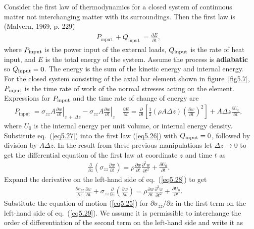 \documentclass{AeroStructure-ERJohnson}
\begin{document}
Consider the first law of thermodynamics for a closed system of continuous matter not interchanging matter with its surroundings. Then the first law is (Malvern, 1969, p. 229)
\begin{align}\label{eq5.26}
P_{\text {input }}+Q_{\text {input }}=\frac{\partial E}{\partial t},
\end{align}
where $P_{\rm input}$ is the power input of the external loads, $Q_{\rm input}$ is the rate of heat input, and $E$ is the total energy of the system. Assume the process is \textbf{adiabatic} so $Q_{\rm input} = 0$. The energy is the sum of the kinetic energy and internal energy. For the closed system consisting of the axial bar element shown in figure~\ref{fig5.7}, $P_{\rm input}$ is the time rate of work of the normal stresses acting on the element. Expressions for $P_{\rm input}$ and the time rate of change of energy are
\begin{align}\label{eq5.27}
P_{\text {input }}=\left.\sigma_{z z} A \frac{\partial w}{\partial t}\right|_{z\,+\,\Delta z}-\left.\sigma_{z z} A \frac{\partial w}{\partial t}\right|_{z} \quad \frac{\partial E}{\partial t}=\frac{\partial}{\partial t}\left[\frac{1}{2}(\rho A \Delta z)\left(\frac{\partial w}{\partial t}\right)^{2}\right]+A \Delta z \frac{\partial U_{0}}{\partial t},
\end{align}
where $U_0$ is the internal energy per unit volume, or internal energy density. Substitute eq.~(\ref{eq5.27}) into the first law (\ref{eq5.26}) with $Q_{\rm input} = 0$, followed by division by $A\Delta z$. In the result from these previous manipulations let $\Delta z \rightarrow 0$ to get the differential equation of the first law at coordinate $z$ and time $t$ as\pagebreak
\begin{align}\label{eq5.28}
\frac{\partial}{\partial z}\left(\sigma_{z z} \frac{\partial w}{\partial t}\right)=\rho \frac{\partial w}{\partial t} \frac{\partial^{2} w}{\partial t^{2}}+\frac{\partial U_{0}}{\partial t}.
\end{align}
Expand the derivative on the left-hand side of eq.~(\ref{eq5.28}) to get
\begin{align}\label{eq5.29}
\frac{\partial \sigma_{z z}}{\partial z} \frac{\partial w}{\partial t}+\sigma_{z z} \frac{\partial}{\partial z}\left(\frac{\partial w}{\partial t}\right)=\rho \frac{\partial w}{\partial t} \frac{\partial^{2} w}{\partial t^{2}}+\frac{\partial U_{0}}{\partial t}.
\end{align}
Substitute the equation of motion (\ref{eq5.25}) for $\partial \sigma_{z z} / \partial z$ in the first term on the left-hand side of eq.~(\ref{eq5.29}). We assume it is permissible to interchange the order of differentiation of the second term on the left-hand side and write it as
\end{document}
